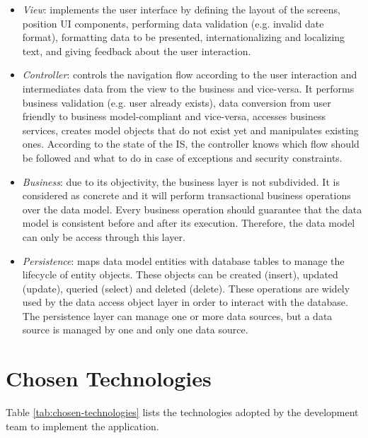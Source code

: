 \documentclass[envcountsame,envcountchap]{svmono}
\begin{document}
\begin{itemize}
\item \textit{View}: implements the user interface by defining the layout of the screens, position UI components, performing data validation (e.g. invalid date format), formatting data to be presented, internationalizing and localizing text, and giving feedback about the user interaction.

\item \textit{Controller}: controls the navigation flow according to the user interaction and intermediates data from the view to the business and vice-versa. It performs business validation (e.g. user already exists), data conversion from user friendly to business model-compliant and vice-versa, accesses business services, creates model objects that do not exist yet and manipulates existing ones. According to the state of the IS, the controller knows which flow should be followed and what to do in case of exceptions and security constraints.

\item \textit{Business}: due to its objectivity, the business layer is not subdivided. It is considered as concrete and it will perform transactional business operations over the data model. Every business operation should guarantee that the data model is consistent before and after its execution. Therefore, the data model can only be access through this layer.

\item \textit{Persistence}: maps data model entities with database tables to manage the lifecycle of entity objects. These objects can be created (insert), updated (update), queried (select) and deleted (delete). These operations are widely used by the data access object layer in order to interact with the database. The persistence layer can manage one or more data sources, but a data source is managed by one and only one data source.
\end{itemize}

\section{Chosen Technologies}

Table \ref{tab:chosen-technologies} lists the technologies adopted by the development team to implement the application.
\end{document}
